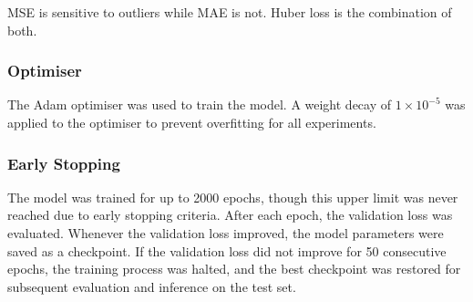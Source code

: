 MSE is sensitive to outliers while MAE is not. Huber loss is the combination of both\cite{loss_functions}. 

\subsubsection{Optimiser}

The Adam optimiser was used to train the model. A weight decay of $1 \times 10^{-5}$ was applied to the optimiser to prevent overfitting for all experiments.

\subsubsection{Early Stopping}

The model was trained for up to 2000 epochs, though this upper limit was never reached due to early stopping criteria. After each epoch, the validation loss was evaluated. Whenever the validation loss improved, the model parameters were saved as a checkpoint. If the validation loss did not improve for 50 consecutive epochs, the training process was halted, and the best checkpoint was restored for subsequent evaluation and inference on the test set.

